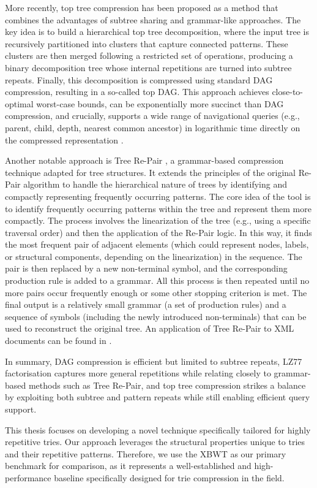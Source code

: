 More recently, top tree compression has been proposed as a method that combines the advantages of subtree sharing and grammar-like approaches. The key idea is to build a hierarchical top tree decomposition, where the input tree is recursively partitioned into clusters that capture connected patterns. These clusters are then merged following a restricted set of operations, producing a binary decomposition tree whose internal repetitions are turned into subtree repeats. Finally, this decomposition is compressed using standard DAG compression, resulting in a so-called top DAG. This approach achieves close-to-optimal worst-case bounds, can be exponentially more succinct than DAG compression, and crucially, supports a wide range of navigational queries (e.g., parent, child, depth, nearest common ancestor) in logarithmic time directly on the compressed representation \cite{billeTreeCompressionTop2015}.

Another notable approach is Tree Re-Pair \cite{lohrey2011tree}, a grammar-based compression technique adapted for tree structures. It extends the principles of the original Re-Pair algorithm \cite{larsson2000off} to handle the hierarchical nature of trees by identifying and compactly representing frequently occurring patterns.
The core idea of the tool is to identify frequently occurring patterns within the tree and represent them more compactly.
The process involves the linearization of the tree (e.g., using a specific traversal order) and then the application of the Re-Pair logic. In this way, it finds the most frequent pair of adjacent elements (which could represent nodes, labels, or structural components, depending on the linearization) in the sequence. The pair is then replaced by a new non-terminal symbol, and the corresponding production rule is added to a grammar. All this process is then repeated until no more pairs occur frequently enough or some other stopping criterion is met. The final output is a relatively small grammar (a set of production rules) and a sequence of symbols (including the newly introduced non-terminals) that can be used to reconstruct the original tree. An application of Tree Re-Pair to XML documents can be found in \cite{lohrey2013xml}.

In summary, DAG compression is efficient but limited to subtree repeats, LZ77 factorisation captures more general repetitions while relating closely to grammar-based methods such as Tree Re-Pair, and top tree compression strikes a balance by exploiting both subtree and pattern repeats while still enabling efficient query support.

This thesis focuses on developing a novel technique specifically tailored for highly repetitive tries. Our approach leverages the structural properties unique to tries and their repetitive patterns. Therefore, we use the XBWT as our primary benchmark for comparison, as it represents a well-established and high-performance baseline specifically designed for trie compression in the field.
